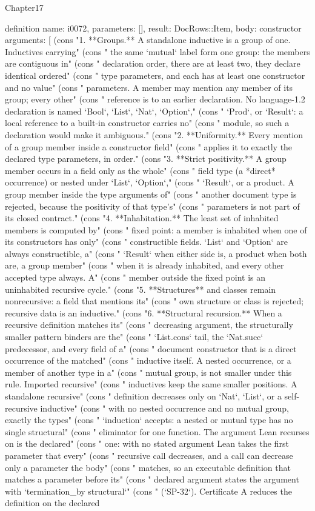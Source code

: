 \begin{lexlean}{Chapter17}
\begin{semanticmodule}
definition{
  name: i0072,
  parameters: [],
  result: DocRows::Item,
  body: constructor{
    arguments: [
      (cons "1. **Groups.** A standalone inductive is a group of one. Inductives carrying" (cons "   the same `mutual` label form one group: the members are contiguous in" (cons "   declaration order, there are at least two, they declare identical ordered" (cons "   type parameters, and each has at least one constructor and no value" (cons "   parameters. A member may mention any member of its group; every other" (cons "   reference is to an earlier declaration. No language-1.2 declaration is named `Bool`, `List`, `Nat`, `Option`," (cons "   `Prod`, or `Result`: a local reference to a built-in constructor carries no" (cons "   module, so such a declaration would make it ambiguous." (cons "2. **Uniformity.** Every mention of a group member inside a constructor field" (cons "   applies it to exactly the declared type parameters, in order." (cons "3. **Strict positivity.** A group member occurs in a field only as the whole" (cons "   field type (a *direct* occurrence) or nested under `List`, `Option`," (cons "   `Result`, or a product. A group member inside the type arguments of" (cons "   another document type is rejected, because the positivity of that type's" (cons "   parameters is not part of its closed contract." (cons "4. **Inhabitation.** The least set of inhabited members is computed by" (cons "   fixed point: a member is inhabited when one of its constructors has only" (cons "   constructible fields. `List` and `Option` are always constructible, a" (cons "   `Result` when either side is, a product when both are, a group member" (cons "   when it is already inhabited, and every other accepted type always. A" (cons "   member outside the fixed point is an uninhabited recursive cycle." (cons "5. **Structures** and classes remain nonrecursive: a field that mentions its" (cons "   own structure or class is rejected; recursive data is an inductive." (cons "6. **Structural recursion.** When a recursive definition matches its" (cons "   decreasing argument, the structurally smaller pattern binders are the" (cons "   `List.cons` tail, the `Nat.succ` predecessor, and every field of a" (cons "   document constructor that is a direct occurrence of the matched" (cons "   inductive itself. A nested occurrence, or a member of another type in a" (cons "   mutual group, is not smaller under this rule. Imported recursive" (cons "   inductives keep the same smaller positions. A standalone recursive" (cons "   definition decreases only on `Nat`, `List`, or a self-recursive inductive" (cons "   with no nested occurrence and no mutual group, exactly the types" (cons "   `induction` accepts: a nested or mutual type has no single structural" (cons "   eliminator for one function. The argument Lean recurses on is the declared" (cons "   one: with no stated argument Lean takes the first parameter that every" (cons "   recursive call decreases, and a call can decrease only a parameter the body" (cons "   matches, so an executable definition that matches a parameter before its" (cons "   declared argument states the argument with `termination_by structural`" (cons "   (`SP-32`). Certificate A reduces the definition on the declared }}
\end{semanticmodule}
\end{lexlean}
